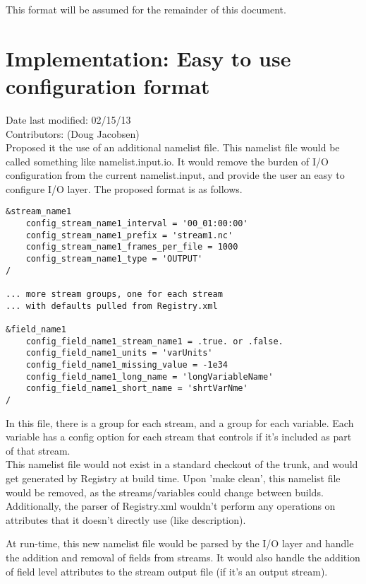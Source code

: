 \documentclass[11pt]{report}
\begin{document}
This format will be assumed for the remainder of this document.

\section{Implementation: Easy to use configuration format}
Date last modified: 02/15/13 \\
Contributors: (Doug Jacobsen) \\

Proposed it the use of an additional namelist file. This namelist file would be
called something like namelist.input.io. It would remove the burden of I/O
configuration from the current namelist.input, and provide the user an easy to
configure I/O layer. The proposed format is as follows.

{\small
\begin{lstlisting}
&stream_name1
	config_stream_name1_interval = '00_01:00:00'
	config_stream_name1_prefix = 'stream1.nc'
	config_stream_name1_frames_per_file = 1000
	config_stream_name1_type = 'OUTPUT'
/

... more stream groups, one for each stream
...	with defaults pulled from Registry.xml

&field_name1
	config_field_name1_stream_name1 = .true. or .false.
	config_field_name1_units = 'varUnits'
	config_field_name1_missing_value = -1e34
	config_field_name1_long_name = 'longVariableName'
	config_field_name1_short_name = 'shrtVarNme'
/
\end{lstlisting}
}

In this file, there is a group for each stream, and a group for each variable.
Each variable has a config option for each stream that controls if it's
included as part of that stream. \\

This namelist file would not exist in a standard checkout of the trunk, and
would get generated by Registry at build time. Upon 'make clean', this
namelist file would be removed, as the streams/variables could change between
builds. \\

Additionally, the parser of Registry.xml wouldn't perform any operations on
attributes that it doesn't directly use (like description).

At run-time, this new namelist file would be parsed by the I/O layer and handle
the addition and removal of fields from streams. It would also handle the
addition of field level attributes to the stream output file (if it's an output
stream).
\end{document}
